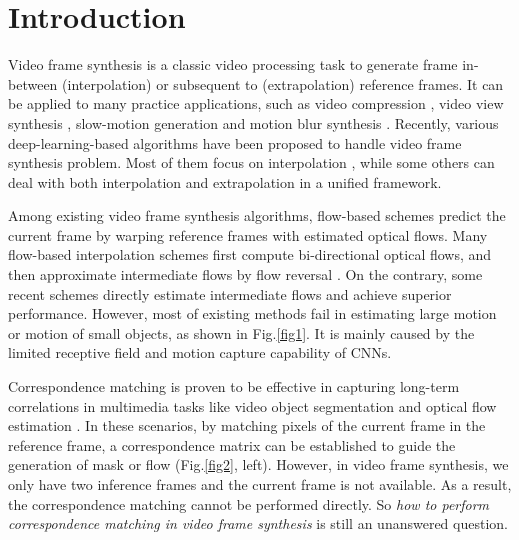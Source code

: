 \documentclass[sigconf]{acmart}
\begin{document}
\section{Introduction}
\label{sec:intro}

Video frame synthesis is a classic video processing task to generate frame in-between (interpolation) or subsequent to (extrapolation) reference frames. It can be applied to many practice applications, such as video compression \cite{wu2018video, pourreza2021extending}, video view synthesis \cite{kalantari2016learning, flynn2016deepstereo}, slow-motion generation \cite{jiang2018super} and motion blur synthesis \cite{brooks2019learning}. Recently, various deep-learning-based algorithms have been proposed to handle video frame synthesis problem. Most of them focus on interpolation \cite{jiang2018super, bao2019memc,park2020bmbc, huang2020rife,park2021asymmetric, lee2020adacof, niklaus2017video, sim2021xvfi}, while some others \cite{liu2017video} can deal with both interpolation and extrapolation in a unified framework.

Among existing video frame synthesis algorithms, flow-based schemes predict the current frame by warping reference frames with estimated optical flows. Many flow-based interpolation schemes \cite{jiang2018super, bao2019memc, bao2019depth} first compute bi-directional optical flows, and then approximate intermediate flows by flow reversal \cite{jiang2018super, liu2020enhanced}. On the contrary, some recent schemes \cite{park2020bmbc,park2021asymmetric,huang2020rife} directly estimate intermediate flows and achieve superior performance. However, most of existing methods fail in estimating large motion or motion of small objects, as shown in Fig.\ref{fig1}. It is mainly caused by the limited receptive field and motion capture capability of CNNs.


Correspondence matching is proven to be effective in capturing long-term correlations in multimedia tasks like video object segmentation \cite{yang2021collaborative,cheng2021rethinking} and optical flow estimation \cite{teed2020raft,jiang2021learning}. In these scenarios, by matching pixels of the current frame in the reference frame, a correspondence matrix can be established to guide the generation of mask or flow (Fig.\ref{fig2}, left). However, in video frame synthesis, we only have two inference frames and the current frame is not available. As a result, the correspondence matching cannot be performed directly. So \textit{how to perform correspondence matching in video frame synthesis} is still an unanswered question.
\end{document}
